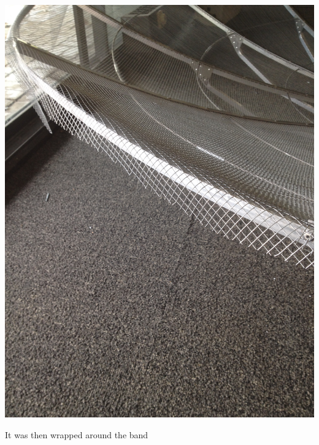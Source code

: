 \documentclass[11pt]{article} %
\begin{document}
\begin{center}
\includegraphics[scale=0.12]{dish/17.jpeg}
\end{center}

It was then wrapped around the band
\end{document}
